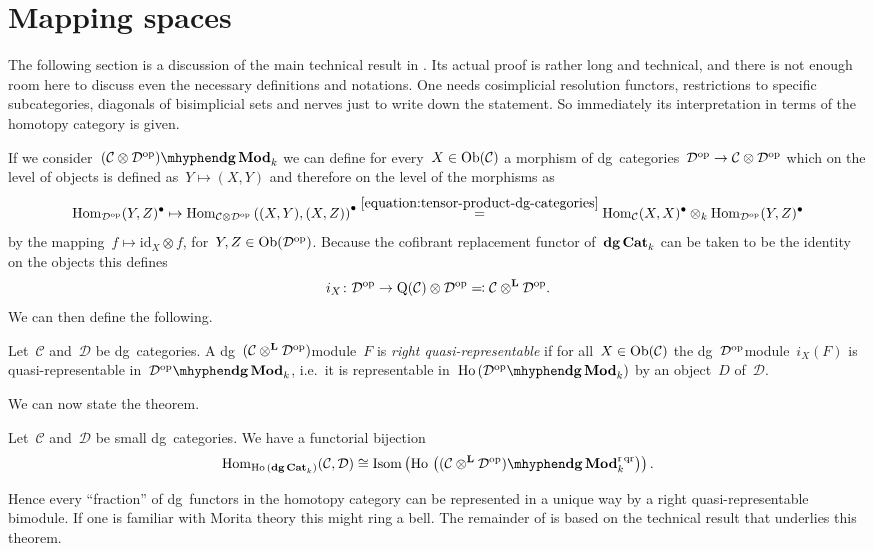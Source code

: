 \section{Mapping spaces}
The following section is a discussion of the main technical result in \cite{toen}. Its actual proof is rather long and technical, and there is not enough room here to discuss even the necessary definitions and notations. One needs cosimplicial resolution functors, restrictions to specific subcategories, diagonals of bisimplicial sets and nerves just to write down the statement. So immediately its interpretation in terms of the homotopy category is given.

If we consider~$\dgMod{(\mathcal{C}\otimes\mathcal{D}^\opp)}_k$ we can define for every~$X\in\mathrm{Ob}(\mathcal{C})$ a morphism of dg~categories~$\mathcal{D}^{\mathrm{op}}\to\mathcal{C}\otimes\mathcal{D}^{\mathrm{op}}$ which on the level of objects is defined as~$Y\mapsto(X,Y)$ and therefore on the level of the morphisms as
\begin{equation}
  \mathrm{Hom}_{\mathcal{D}^{\mathrm{op}}}(Y,Z)^\bullet\mapsto\mathrm{Hom}_{\mathcal{C}\otimes\mathcal{D}^{\mathrm{op}}}\left( (X,Y),(X,Z) \right)^\bullet\overset{\eqref{equation:tensor-product-dg-categories}}{=}\mathrm{Hom}_{\mathcal{C}}(X,X)^\bullet\otimes_k\mathrm{Hom}_{\mathcal{D}^{\mathrm{op}}}(Y,Z)^\bullet
\end{equation}
by the mapping~$f\mapsto\mathrm{id}_X\otimes f$, for~$Y,Z\in\mathrm{Ob}(\mathcal{D}^{\mathrm{op}})$. Because the cofibrant replacement functor of~$\mathbf{dg\,Cat}_k$ can be taken to be the identity on the objects \cite[proposition 2.3]{toen} this defines
\begin{equation}
  i_X\colon\mathcal{D}^{\mathrm{op}}\to\operatorname{Q}(\mathcal{C})\otimes\mathcal{D}^{\mathrm{op}}\eqqcolon\mathcal{C}\otimes^{\mathbf{L}}\mathcal{D}^{\mathrm{op}}.
\end{equation}
We can then define the following.
\begin{definition}
  Let~$\mathcal{C}$ and~$\mathcal{D}$ be dg~categories. A dg~$(\mathcal{C}\otimes^{\mathbf{L}}\mathcal{D}^{\mathrm{op}})$\dash module~$F$ is \emph{right quasi-representable} if for all~$X\in\mathrm{Ob}(\mathcal{C})$ the dg~$\mathcal{D}^{\mathrm{op}}$\dash module~$i_X(F)$ is quasi-representable in~$\dgMod{\mathcal{D}^\opp}_k$, i.e.\ it is representable in~$\Ho(\dgMod{\mathcal{D}^\opp}_k)$ by an object~$D$ of~$\mathcal{D}$.
\end{definition}
We can now state the theorem.
\begin{theorem}
  \label{theorem:fundamental-bijection}
  Let~$\mathcal{C}$ and~$\mathcal{D}$ be small dg~categories. We have a functorial bijection
  \begin{equation}
    \label{equation:fundamental-bijection}
    \Hom_{\Ho(\dgCat_k)}(\mathcal{C},\mathcal{D})\cong\Isom\left( \Ho\left( \dgMod{(\mathcal{C}\LLLotimes\mathcal{D}^\opp)}_k^\rqr \right) \right).
  \end{equation}
\end{theorem}
Hence every ``fraction'' of dg~functors in the homotopy category can be represented in a unique way by a right quasi-representable bimodule. If one is familiar with Morita theory this might ring a bell. The remainder of \cite{toen} is based on the technical result that underlies this theorem.  


